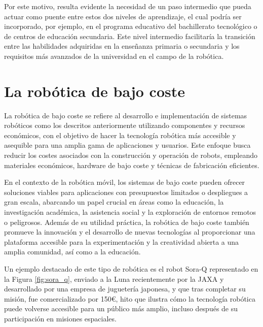 Por este motivo, resulta evidente la necesidad de un paso intermedio que pueda
actuar como puente entre estos dos niveles de aprendizaje, el cual podría ser
incorporado, por ejemplo, en el programa educativo del bachillerato tecnológico
o de centros de educación secundaria.
Este nivel intermedio facilitaría la transición entre las habilidades adquiridas
en la enseñanza primaria o secundaria y los requisitos más avanzados de la
universidad en el campo de la robótica.



\section{La robótica de bajo coste}
\label{sec:robotica_bajo_coste} %

La robótica de bajo coste se refiere al desarrollo e implementación de sistemas
robóticos como los descritos anteriormente utilizando componentes y recursos
económicos, con el objetivo de hacer la tecnología robótica más accesible y
asequible para una amplia gama de aplicaciones y usuarios.
Este enfoque busca reducir los costes asociados con la construcción y operación
de robots, empleando materiales económicos, hardware de bajo coste y técnicas
de fabricación eficientes.

En el contexto de la robótica móvil, los sistemas de bajo coste pueden ofrecer
soluciones viables para aplicaciones con presupuestos limitados o despliegues a
gran escala, abarcando un papel crucial en áreas como la educación, la
investigación académica, la asistencia social y la exploración de entornos
remotos o peligrosos.
Además de su utilidad práctica, la robótica de bajo coste también promueve la
innovación y el desarrollo de nuevas tecnologías al proporcionar una plataforma
accesible para la experimentación y la creatividad abierta a una amplia
comunidad, así como a la educación.

Un ejemplo destacado de este tipo de robótica es el robot Sora-Q representado en
la Figura \ref{fig:sora_q}, enviado a la Luna recientemente por la JAXA y
desarrollado por una empresa de juguetería japonesa, y que tras completar su
misión, fue comercializado por 150\euro, hito que ilustra cómo la tecnología
robótica puede volverse accesible para un público más amplio, incluso
después de su participación en misiones espaciales.

